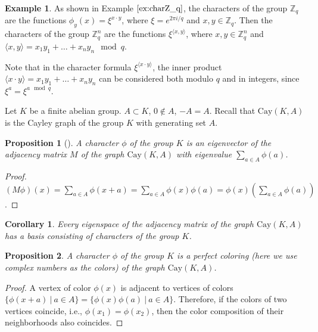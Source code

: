 \documentclass[11pt]{article}
\newtheorem{claim}{Proposition}[section]
\newtheorem{corollary}{Corollary}[section]
\theoremstyle{definition}
\newtheorem{example}{Example}[section]
\begin{document}
{{{\begin{example}
As shown in Example $\ref{ex:charZ_q}$, the characters of the group
$\mathbb{Z}_q$ are the functions $\phi_y(x)=\xi^{x\cdot y}$, where
$\xi=e^{2\pi i/q}$ and $x,y\in \mathbb{Z}_q$. Then the characters of the group
$\mathbb{Z}^n_q$ are the functions $\xi^{\langle x, y\rangle}$, where
$x,y\in \mathbb{Z}^n_q$ and $\langle x,
y\rangle=x_1y_1+\dots+x_ny_n\mod q$.
\end{example}

Note that in the character formula $\xi^{\langle x\cdot y\rangle}$,
the inner product $\langle x\cdot
y\rangle=x_1y_1+\dots+x_ny_n$ can be considered both modulo $q$
and in integers, since $\xi^a=\xi^{a\mod q}$.




Let $K$ be a finite abelian group. $A\subset K$, $0 \notin A$,
$-A=A$. Recall that $\mathrm{Cay}(K,A)$
is the Cayley graph of the group $K$ with generating set $A$.

\begin{claim}[\cite{Bab}]\label{c:char_egenfunc}
    A character $\phi$ of the group $K$ is an eigenvector of the adjacency matrix $M$ of the graph $\mathrm{Cay}(K,A)$
    with eigenvalue
    $\sum\limits_{a\in A}\phi(a)$.
\end{claim}
\begin{proof}

    $(M\phi)(x)=\sum\limits_{a\in A}\phi(x+a)=
    \sum\limits_{a\in A}\phi(x)\phi(a)=\phi(x)\left(\sum\limits_{a\in A}\phi(a)\right)$.
\end{proof}

\begin{corollary}\label{c:baschar}
Every eigenspace of the adjacency matrix of the graph
$\mathrm{Cay}(K,A)$ has a basis consisting of characters of the group $K$.
\end{corollary}


\begin{claim}
    A character $\phi$ of the group $K$ is a perfect coloring (here we use complex numbers as the colors) of the graph $\mathrm{Cay}(K,A)$.
\end{claim}
\begin{proof}
A vertex of color $\phi(x)$ is adjacent to vertices of colors $\{\phi(x+a)\ |\
a\in A\}=\{\phi(x)\phi(a)\ |\ a\in A\}$. Therefore, if the colors of two
vertices coincide, i.e., $\phi(x_1)=\phi(x_2)$, then the color composition
of their neighborhoods also coincides.
\end{proof}

}}}
\end{document}
